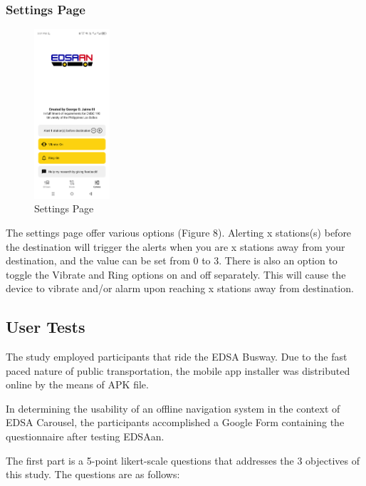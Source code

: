 \documentclass[journal]{./IEEE/IEEEtran}
\begin{document}
\subsubsection{\textbf{Settings Page}}

\begin{figure}[htbp]
  \centering
  \includegraphics[width=0.25\textwidth]{ICS-template/screenshots/EDSAan_settings.png}
  \caption{Settings Page}
  \label{fig:yourlabel}
\end{figure}

The settings page offer various options (Figure 8). Alerting x stations(s) before the destination will trigger the alerts when you are x stations away from your destination, and the value can be set from 0 to 3. There is also an option to toggle the Vibrate and Ring options on and off separately. This will cause the device to vibrate and/or alarm upon reaching x stations away from destination.

\subsection{User Tests}
The study employed participants that ride the EDSA Busway. Due to the fast paced nature of public transportation, the mobile app installer was distributed online by the means of APK file.

In determining the usability of an offline navigation system in the context of EDSA Carousel, the participants accomplished a Google Form containing the questionnaire after testing EDSAan.

The first part is a 5-point likert-scale questions that addresses the 3 objectives of this study. The questions are as follows:
\end{document}
